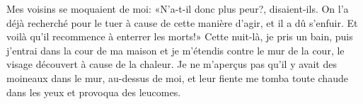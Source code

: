 Mes voisins se moquaient de moi: «N’a-t-il donc plus peur?, disaient-ils.
On l’a déjà recherché pour le tuer à cause de cette manière d’agir,
	et il a dû s’enfuir.
	Et voilà qu’il recommence à enterrer les morts!»
Cette nuit-là, je pris un bain,
	puis j’entrai dans la cour de ma maison et je m’étendis contre le mur de la cour,
	le visage découvert à cause de la chaleur.
Je ne m’aperçus pas qu’il y avait des moineaux dans le mur, au-dessus de moi,
	et leur fiente me tomba toute chaude dans les yeux et provoqua des leucomes.
